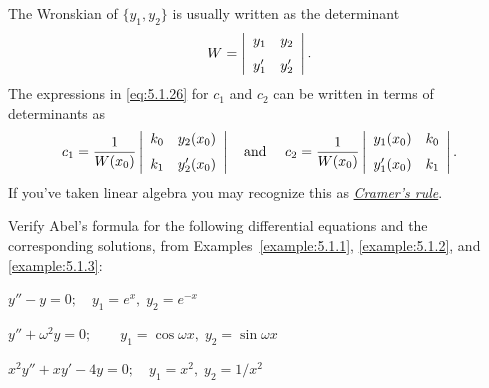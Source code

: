 The Wronskian of $\{y_{1},y_{2}\}$ is usually written as the determinant
\[
  W=\left|
  \begin{array}{cc}
    y_{1}  & y_{2}  \\[2\jot]
    y'_{1} & y'_{2}
  \end{array}\right|.
\]
The expressions in \eqref{eq:5.1.26} for $c_{1}$ and $c_{2}$ can be written in terms of determinants
as
\[
  c_{1}=\frac{1}{W(x_{0})}\left|
  \begin{array}{cc}
    k_{0} & y_{2}(x_{0})  \\[2\jot]
    k_{1} & y'_{2}(x_{0})
  \end{array}\right| \mbox{\quad and \quad}c_{2}=\frac{1}{W(x_{0})}\left|
  \begin{array}{cc}
    y_{1}(x_{0})  & k_{0} \\[2\jot]
    y'_{1}(x_{0}) & k_{1}
  \end{array}\right|.
\]
If you've taken linear algebra you may recognize this as
\href{https://mathshistory.st-andrews.ac.uk/Biographies/Cramer/}{\color{blue}
\it Cramer's rule}.

\begin{example}
  \label{example:5.1.5} \rm Verify Abel's formula for the following differential equations and the
  corresponding solutions, from Examples~\ref{example:5.1.1}, \ref{example:5.1.2}, and
  \ref{example:5.1.3}:
  \begin{alist}
    \item %
    $y''-y=0;\quad y_{1}=e^{x},\;y_{2}=e^{-x}$

    \item %
    $y''+\omega^{2}y=0;\quad\quad y_{1}=\cos\omega x,\;y_{2}=\sin\omega x$

    \item %
    $x^{2}y''+xy'-4y=0;\quad y_{1}=x^{2},\;y_{2}=1/x^{2}$
  \end{alist}
\end{example}

